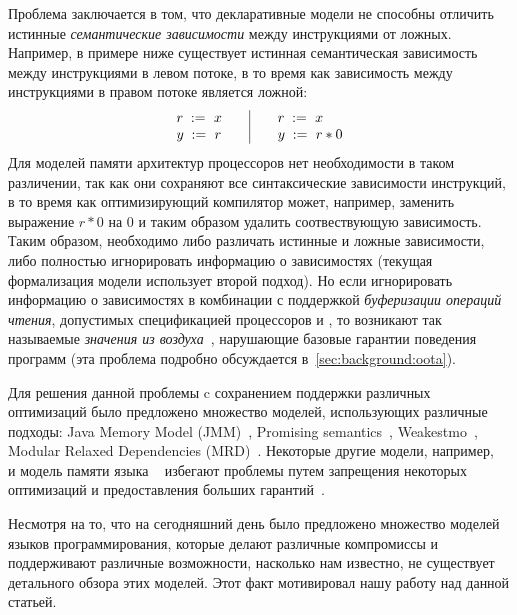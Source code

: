 Проблема заключается в том, что декларативные модели не способны 
отличить истинные \emph{семантические зависимости} между инструкциями от ложных.
Например, в примере ниже существует истинная семантическая зависимость между 
инструкциями в левом потоке, в то время как зависимость между 
инструкциями в правом потоке является ложной:
\[\begin{array}{l@{\qquad}|@{\qquad}l}
\readInst{}{r}{x} & \readInst{}{r}{x} \\
\writeInst{}{y}{r} & \readInst{}{y}{r * 0} \\
\end{array}\]
Для моделей памяти архитектур процессоров нет необходимости в таком различении, 
так как они сохраняют все синтаксические зависимости инструкций, 
в то время как оптимизирующий компилятор может, например, заменить выражение 
$r * 0$ на $0$ и таким образом удалить соотвествующую зависимость. 
Таким образом, необходимо либо различать истинные и ложные зависимости, 
либо полностью игнорировать информацию о зависимостях 
(текущая формализация модели \CPP использует второй подход).
Но если игнорировать информацию о зависимостях в комбинации с 
поддержкой \emph{буферизации операций чтения}, допустимых 
спецификацией процессоров \ARM и \POWER, 
то возникают так называемые 
\emph{значения из воздуха}~\cite{Boehm-Demsky:MSPC14}, 
нарушающие  базовые гарантии поведения программ
(эта проблема подробно обсуждается в~\cref{sec:background:oota}).

Для решения данной проблемы c сохранением
поддержки различных оптимизаций было предложено 
множество моделей, использующих различные подходы:
Java Memory Model (JMM)~\cite{Manson-al:POPL05}, Promising semantics~\cite{Kang-al:POPL17,Lee-al:PLDI20},
Weakestmo~\cite{Chakraborty-Vafeiadis:POPL19}, Modular Relaxed Dependencies (MRD)~\cite{Paviotti-al:ESOP20}.
Некоторые другие модели, например, \RCMM~\cite{Lahav-al:PLDI17} и модель памяти языка \OCaml~\cite{Dolan-al:PLDI18} избегают проблемы путем запрещения некоторых оптимизаций и предоставления больших гарантий~\cite{Ou-Demsky:OOPSLA18}.

Несмотря на то, что на сегодняшний день было предложено множество моделей языков программирования, которые
делают различные компромиссы и поддерживают различные возможности, 
насколько нам известно, не существует детального обзора этих моделей. 
Этот факт мотивировал нашу работу над данной статьей.

